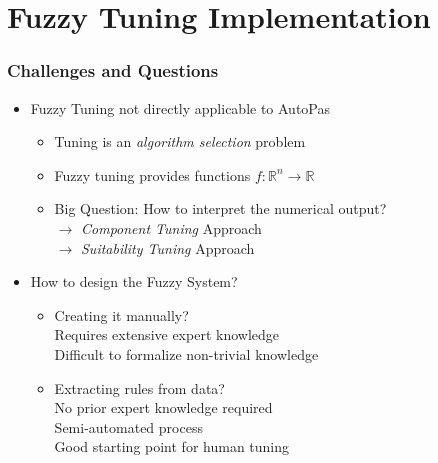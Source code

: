 \documentclass[
	10pt,
	t		%
]{beamer}
\newcommand{\xmark}{\ding{55}}%
\newcommand{\cmark}{\ding{51}}%
\begin{document}
\section{Fuzzy Tuning Implementation}
\begin{frame}
	\frametitle{Challenges and Questions}
	
	\begin{itemize}
		\item Fuzzy Tuning not directly applicable to AutoPas
		      \begin{itemize}
			      \item Tuning is an \textit{algorithm selection} problem
			      \item Fuzzy tuning provides functions $f :\mathbb{R}^n \rightarrow \mathbb{R}$
			      \item Big Question: How to interpret the numerical output?\\
			            \quad $\rightarrow$ \textit{Component Tuning} Approach \\
			            \quad $\rightarrow$ \textit{Suitability Tuning} Approach
		      \end{itemize}
		\item How to design the Fuzzy System?
		      \begin{itemize}
			      \item Creating it manually?\\
			            \quad \xmark \; Requires extensive expert knowledge\\
			            \quad \xmark \; Difficult to formalize non-trivial knowledge
			      \item Extracting rules from data?\\
			            \quad \cmark \; No prior expert knowledge required\\
			            \quad \cmark \; Semi-automated process\\
			            \quad \cmark \; Good starting point for human tuning
		      \end{itemize}
	\end{itemize}
\end{frame}
\end{document}

